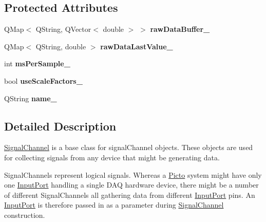 \subsection*{Protected Attributes}
\begin{DoxyCompactItemize}
\item 
\hypertarget{class_picto_1_1_signal_channel_abc9e24321005434a885bcb951a31bfcb}{Q\-Map$<$ Q\-String, Q\-Vector$<$ double $>$ $>$ {\bfseries raw\-Data\-Buffer\-\_\-}}\label{class_picto_1_1_signal_channel_abc9e24321005434a885bcb951a31bfcb}

\item 
\hypertarget{class_picto_1_1_signal_channel_a649e84bd10a07938af4a4c41d3dcb869}{Q\-Map$<$ Q\-String, double $>$ {\bfseries raw\-Data\-Last\-Value\-\_\-}}\label{class_picto_1_1_signal_channel_a649e84bd10a07938af4a4c41d3dcb869}

\item 
\hypertarget{class_picto_1_1_signal_channel_a021e383cb5e3b4e64ff2085b126ff697}{int {\bfseries ms\-Per\-Sample\-\_\-}}\label{class_picto_1_1_signal_channel_a021e383cb5e3b4e64ff2085b126ff697}

\item 
\hypertarget{class_picto_1_1_signal_channel_a40d7f267a3c660cca86e95edcf70e97f}{bool {\bfseries use\-Scale\-Factors\-\_\-}}\label{class_picto_1_1_signal_channel_a40d7f267a3c660cca86e95edcf70e97f}

\item 
\hypertarget{class_picto_1_1_signal_channel_a6d775f0e96b2c7ec456a2b3c030b65e1}{Q\-String {\bfseries name\-\_\-}}\label{class_picto_1_1_signal_channel_a6d775f0e96b2c7ec456a2b3c030b65e1}

\end{DoxyCompactItemize}


\subsection{Detailed Description}
\hyperlink{class_picto_1_1_signal_channel}{Signal\-Channel} is a base class for signal\-Channel objects. These objects are used for collecting signals from any device that might be generating data. 

Signal\-Channels represent logical signals. Whereas a \hyperlink{namespace_picto}{Picto} system might have only one \hyperlink{class_picto_1_1_input_port}{Input\-Port} handling a single D\-A\-Q hardware device, there might be a number of different Signal\-Channels all gathering data from different \hyperlink{class_picto_1_1_input_port}{Input\-Port} pins. An \hyperlink{class_picto_1_1_input_port}{Input\-Port} is therefore passed in as a parameter during \hyperlink{class_picto_1_1_signal_channel}{Signal\-Channel} construction.


